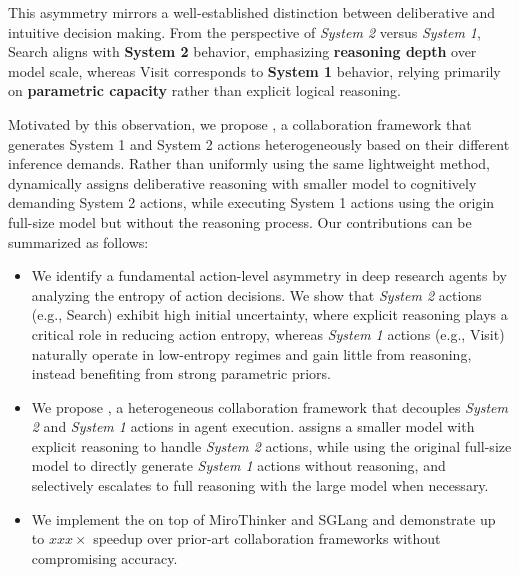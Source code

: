 This asymmetry mirrors a well-established distinction between deliberative and intuitive decision making.
From the perspective of \textit{System 2} versus \textit{System 1}, Search aligns with \textbf{System 2} behavior, emphasizing \textbf{reasoning depth} over model scale, whereas Visit corresponds to \textbf{System 1} behavior, relying primarily on \textbf{parametric capacity} rather than explicit logical reasoning.
 
Motivated by this observation, we propose \method, a collaboration framework that generates System 1 and System 2 actions heterogeneously based on their different inference demands. Rather than uniformly using the same lightweight method, \method dynamically assigns deliberative reasoning with smaller model to cognitively demanding System 2 actions, while executing System 1 actions using the origin full-size model but without the reasoning process.
Our contributions can be summarized as follows:

\begin{itemize}
    \item We identify a fundamental action-level asymmetry in deep research agents by analyzing the entropy of action decisions. We show that \textit{System 2} actions (e.g., Search) exhibit high initial uncertainty, where explicit reasoning plays a critical role in reducing action entropy, whereas \textit{System 1} actions (e.g., Visit) naturally operate in low-entropy regimes and gain little from reasoning, instead benefiting from strong parametric priors.
    
    \item We propose \method, a heterogeneous collaboration framework that decouples \textit{System 2} and \textit{System 1} actions in agent execution. \method assigns a smaller model with explicit reasoning to handle \textit{System 2} actions, while using the original full-size model to directly generate \textit{System 1} actions without reasoning, and selectively escalates to full reasoning with the large model when necessary.
    
    \item We implement the \method  on top of MiroThinker and SGLang and demonstrate up to $xxx\times$ speedup over prior-art collaboration frameworks without compromising accuracy.
\end{itemize}
\fi
